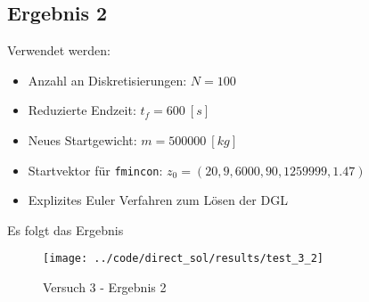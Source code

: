 \newpage
\subsection{Ergebnis 2}\label{kap:Versuch32}
Verwendet werden:
\begin{itemize}
\item Anzahl an Diskretisierungen: $N = 100$ 
\item Reduzierte Endzeit: $t_f = 600 \ [s]$
\item Neues Startgewicht: $m = 500000 \ [kg]$
\item Startvektor für \texttt{fmincon}: $z_0 = (20,9,6000,90,1259999,1.47)$
\item Explizites Euler Verfahren zum Lösen der DGL
\end{itemize}
Es folgt das Ergebnis
\begin{figure}[H]
\begin{center}
\texttt{[image: ../code/direct\_sol/results/test\_3\_2]}
\caption{Versuch 3 - Ergebnis 2}\label{img:test_3_2}
\end{center}
\end{figure}






\newpage

